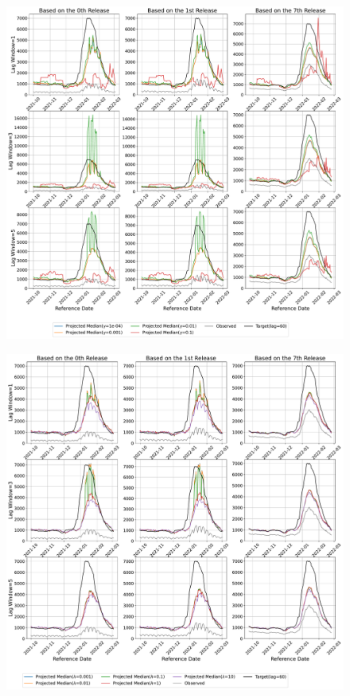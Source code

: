 \begin{figure}
    \centering
    \includegraphics[width=\textwidth]{figs/count_pred_gamma_lagpad_tuning_ca_new_covs_added.pdf}
    \caption{\textit{}}
\end{figure}

\begin{figure}
    \centering
    \includegraphics[width=\textwidth]{figs/count_pred_lambda_lagpad_tuning_ca_new_covs_added.pdf}
    \caption{\textit{}}
\end{figure}

